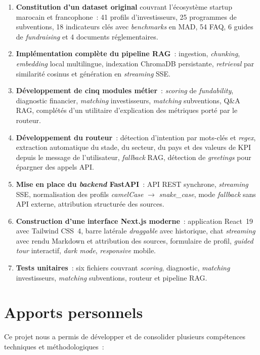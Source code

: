 \begin{enumerate}
  \item \textbf{Constitution d'un dataset original} couvrant l'écosystème startup marocain et francophone~: 41 profils d'investisseurs, 25 programmes de subventions, 18 indicateurs clés avec \textit{benchmarks} en \ac{MAD}, 54 \ac{FAQ}, 6 guides de \textit{fundraising} et 4 documents réglementaires.
  \item \textbf{Implémentation complète du pipeline \ac{RAG}}~: ingestion, \textit{chunking}, \textit{embedding} local multilingue, indexation ChromaDB persistante, \textit{retrieval} par similarité cosinus et génération en \textit{streaming} \ac{SSE}.
  \item \textbf{Développement de cinq modules métier}~: \textit{scoring} de \textit{fundability}, diagnostic financier, \textit{matching} investisseurs, \textit{matching} subventions, Q\&A \ac{RAG}, complétés d'un utilitaire d'explication des métriques porté par le routeur.
  \item \textbf{Développement du routeur}~: détection d'intention par mots-clés et \textit{regex}, extraction automatique du stade, du secteur, du pays et des valeurs de \ac{KPI} depuis le message de l'utilisateur, \textit{fallback} \ac{RAG}, détection de \textit{greetings} pour épargner des appels \ac{API}.
  \item \textbf{Mise en place du \textit{backend} FastAPI}~: \ac{API} \ac{REST} synchrone, \textit{streaming} \ac{SSE}, normalisation des profils \textit{camelCase} $\to$ \textit{snake\_case}, mode \textit{fallback} sans \ac{API} externe, attribution structurée des sources.
  \item \textbf{Construction d'une interface Next.js moderne}~: application React~19 avec Tailwind CSS~4, barre latérale \textit{draggable} avec historique, chat \textit{streaming} avec rendu Markdown et attribution des sources, formulaire de profil, \textit{guided tour} interactif, \textit{dark mode}, \textit{responsive} mobile.
  \item \textbf{Tests unitaires}~: six fichiers couvrant \textit{scoring}, diagnostic, \textit{matching} investisseurs, \textit{matching} subventions, routeur et pipeline \ac{RAG}.
\end{enumerate}

\section{Apports personnels}

Ce projet nous a permis de développer et de consolider plusieurs compétences techniques et méthodologiques~:

